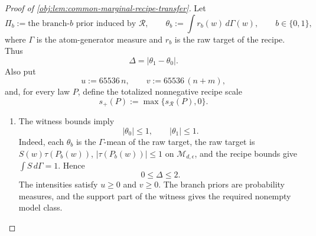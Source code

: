 \documentclass[11pt]{article}
\begin{document}
\begin{proof}[Proof of \cref{obj:lem:common-marginal-recipe-transfer}]
Let
\[
\Pi_b:=\text{the branch-\(b\) prior induced by \(\mathcal R\)},\qquad
\theta_b:=\int r_b(w)\,d\Gamma(w),\qquad b\in\{0,1\},
\]
where \(\Gamma\) is the atom-generator measure and \(r_b\) is the raw target of the recipe.  Thus
\[
\Delta=|\theta_1-\theta_0|.
\]
Also put
\[
u:=65536\,n,\qquad v:=65536\,(n+m),
\]
and, for every law \(P\), define the totalized nonnegative recipe scale
\[
s_+(P):=\max\{s_{\mathcal R}(P),0\}.
\]

\begin{enumerate}
\item The witness bounds imply
\[
|\theta_0|\le 1,\qquad |\theta_1|\le 1.
\]
Indeed, each \(\theta_b\) is the \(\Gamma\)-mean of the raw target, the raw target is \(S(w)\tau(P_b(w))\), \(|\tau(P_b(w))|\le1\) on \(\mathcal M_{d,\epsilon}\), and the recipe bounds give \(\int S\,d\Gamma=1\).  Hence
\[
0\le\Delta\le 2.
\]
The intensities satisfy \(u\ge0\) and \(v\ge0\).  The branch priors are probability measures, and the support part of the witness gives the required nonempty model class. %


\end{enumerate}
\end{proof}
\end{document}
